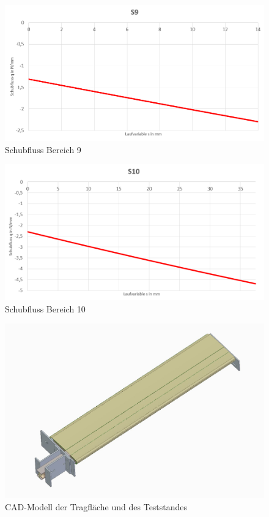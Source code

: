 \begin{figure}[h]
	\includegraphics[width=1.0\textwidth]{Bilder/S9.png}
	\caption{Schubfluss Bereich 9}
\end{figure}
\begin{figure}[h]
	\includegraphics[width=1.0\textwidth]{Bilder/S10.png}
	\caption{Schubfluss Bereich 10}
	\label{fig:S10}
\end{figure}
\begin{figure}[h]
	\includegraphics[width=1.0\textwidth]{Bilder/AufbauGesamt.jpg}
	\caption{CAD-Modell der Tragfläche und des Teststandes}
	\label{fig:AufbauGesamt}
\end{figure}

